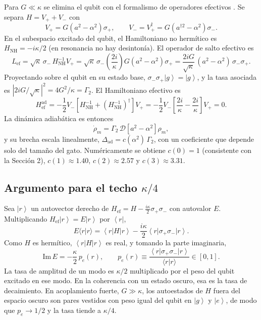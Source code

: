 \documentclass[11pt]{report}
\newcommand{\ket}[1]{\left|#1\right\rangle}
\newcommand{\bra}[1]{\left\langle#1\right|}
\newcommand{\spl}{\sigma_{+}}
\newcommand{\smi}{\sigma_{-}}
\newcommand{\GG}{\Gamma_{2}}
\begin{document}
Para $G\ll\kappa$ se elimina el qubit con el formalismo de operadores efectivos \cite{ReiterSorensen2012}. Se separa $H=V_{+}+V_{-}$ con
\begin{equation}
V_{+}=G(a^{2}-\alpha^{2})\spl, \qquad V_{-}=V_{+}^{\dagger}=G(a^{\dagger 2}-\alpha^{2})\smi .
\end{equation}
En el subespacio excitado del qubit, el Hamiltoniano no herm\'itico es $H_{\mathrm{NH}}=-i\kappa/2$ (en resonancia no hay desinton\'ia). El operador de salto efectivo es
\begin{equation}
L_{\mathrm{ef}} = \sqrt{\kappa}\,\smi\,H_{\mathrm{NH}}^{-1}V_{+}
= \sqrt{\kappa}\,\smi\left(\frac{2i}{\kappa}\right)G(a^{2}-\alpha^{2})\spl
= \frac{2iG}{\sqrt{\kappa}}\,(a^{2}-\alpha^{2})\,\smi\spl .
\end{equation}
Proyectando sobre el qubit en su estado base, $\smi\spl\ket{g}=\ket{g}$, y la tasa asociada es $|2iG/\sqrt{\kappa}|^{2}=4G^{2}/\kappa=\GG$. El Hamiltoniano efectivo es
\begin{equation}
H_{\mathrm{ef}}^{\mathrm{ad}} = -\frac{1}{2}V_{-}\left[H_{\mathrm{NH}}^{-1}+\left(H_{\mathrm{NH}}^{-1}\right)^{\dagger}\right]V_{+}
= -\frac{1}{2}V_{-}\left[\frac{2i}{\kappa}-\frac{2i}{\kappa}\right]V_{+} = 0 .
\end{equation}
La din\'amica adiab\'atica es entonces
\begin{equation}
\boxed{\dot\rho_{m} = \GG\,\mathcal{D}\!\left[a^{2}-\alpha^{2}\right]\rho_{m}},
\end{equation}
y su brecha escala linealmente, $\Delta_{\mathrm{ad}}=c(\alpha^{2})\,\GG$, con un coeficiente que depende solo del tama\~no del gato. Num\'ericamente se obtiene $c(0)=1$ (consistente con la Secci\'on 2), $c(1)\approx1.40$, $c(2)\approx2.57$ y $c(3)\approx3.31$.

\subsection{Argumento para el techo $\kappa/4$}

Sea $\ket{r}$ un autovector derecho de $H_{\mathrm{ef}}=H-\tfrac{i\kappa}{2}\spl\smi$ con autovalor $E$. Multiplicando $H_{\mathrm{ef}}\ket{r}=E\ket{r}$ por $\bra{r}$,
\begin{equation}
E\langle r|r\rangle = \bra{r}H\ket{r} - \frac{i\kappa}{2}\bra{r}\spl\smi\ket{r}.
\end{equation}
Como $H$ es herm\'itico, $\bra{r}H\ket{r}$ es real, y tomando la parte imaginaria,
\begin{equation}
\mathrm{Im}\,E = -\frac{\kappa}{2}\,p_{e}(r), \qquad p_{e}(r)\equiv\frac{\bra{r}\spl\smi\ket{r}}{\langle r|r\rangle}\in[0,1] .
\end{equation}
La tasa de amplitud de un modo es $\kappa/2$ multiplicado por el peso del qubit excitado en ese modo. En la coherencia con un estado oscuro, esa es la tasa de decaimiento. En acoplamiento fuerte, $G\gg\kappa$, los autoestados de $H$ fuera del espacio oscuro son pares vestidos con peso igual del qubit en $\ket{g}$ y $\ket{e}$, de modo que $p_{e}\to1/2$ y la tasa tiende a $\kappa/4$.
\end{document}
